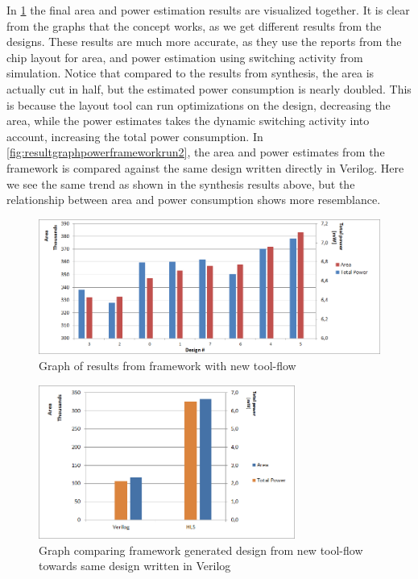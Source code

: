 In \cref{fig:resultgraphframeworkrun3} the final area and power estimation results are visualized together. It is clear from the graphs that the concept works, as we get different results from the designs. These results are much more accurate, as they use the reports from the chip layout for area, and power estimation using switching activity from simulation. Notice that compared to the results from synthesis, the area is actually cut in half, but the estimated power consumption is nearly doubled. This is because the layout tool can run optimizations on the design, decreasing the area, while the power estimates takes the dynamic switching activity into account, increasing the total power consumption. In \cref{fig:resultgraphpowerframeworkrun2}, the area and power estimates from the framework is compared against the same design written directly in Verilog. Here we see the same trend as shown in the synthesis results above, but the relationship between area and power consumption shows more resemblance.

\begin{figure}[hbpt]
\centering
\includegraphics[width=\textwidth]{../figs/resultGraph3.png}
\caption{\label{fig:resultgraphframeworkrun3}Graph of results from framework with new tool-flow}
\end{figure}

\begin{figure}[hbpt]
\centering
\includegraphics[width=0.75\textwidth]{../figs/resultComparison3.png}
\caption{\label{fig:resultcomparisonhlsrun3}Graph comparing framework generated design from new tool-flow towards same design written in Verilog}
\end{figure}

